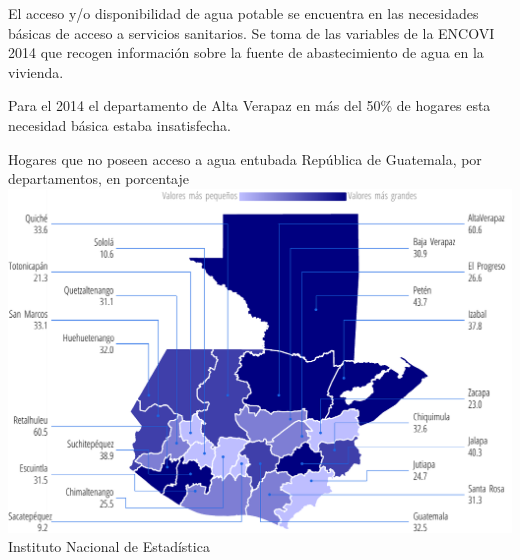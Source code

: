           {%
         El acceso y/o disponibilidad de agua potable se encuentra en las necesidades básicas de acceso a servicios sanitarios.  Se toma de las variables de la ENCOVI 2014 que recogen información sobre la fuente de abastecimiento de agua en la vivienda.
         
         Para el 2014 el departamento de Alta Verapaz en más del 50\% de hogares esta necesidad básica estaba insatisfecha. }%
          {%
          	Hogares que no poseen acceso a agua entubada
          } %
          {%
          	República de Guatemala, por departamentos, en porcentaje} %
          {%
          	\includegraphics[width=52\cuadri]{graficas/1_14.pdf}}%
          {%
          	Instituto Nacional de Estadística} %
          
          
                    
